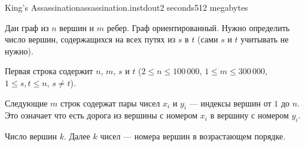 
\begin{problem}{King's Assassination}{assassination.in}{stdout}{2 seconds}{512 megabytes}

Дан граф из $n$ вершин и $m$ ребер. Граф ориентированный.
Нужно определить число вершин, содержащихся на всех путях из $s$ в $t$ (сами $s$ и $t$ учитывать не нужно).

\InputFile

Первая строка содержит $n$, $m$, $s$ и $t$ ($2 \le n \le 100\,000$, $1 \le m \le 300\,000$, $1 \le s, t \le n$, $s \ne t$).

Следующие $m$ строк содержат пары чисел $x_i$ и $y_i$ --- индексы вершин от $1$ до $n$.
Это означает что есть дорога из вершины с номером $x_i$ в вершину с номером $y_i$.

\OutputFile

Число вершин $k$. Далее $k$ чисел --- номера вершин в возрастающем порядке.

\Examples

\begin{example}
%
%
%
\end{example}


\end{problem}
